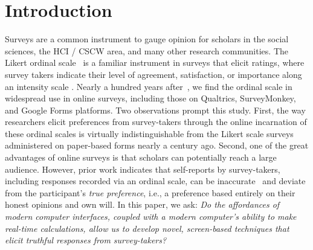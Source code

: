 \section{Introduction}

Surveys are a common instrument to gauge opinion for scholars in the social sciences, the HCI / CSCW area, and many other research communities. The Likert ordinal scale~\cite{likert1932technique} is a familiar instrument in surveys that elicit ratings, where survey takers indicate their level of agreement, satisfaction, or importance along an intensity scale \cite{moors2016two}. Nearly a hundred years after~\textcite{likert1932technique}, we find the ordinal scale in widespread use in online surveys, including those on Qualtrics, SurveyMonkey, and Google Forms platforms. Two observations prompt this study. First, the way researchers elicit preferences from survey-takers through the online incarnation of these ordinal scales is virtually indistinguishable from the Likert scale surveys administered on paper-based forms nearly a century ago.  Second, one of the great advantages of online surveys is that scholars can potentially reach a large audience. However, prior work indicates that self-reports by survey-takers, including responses recorded via an ordinal scale, can be inaccurate~\cite{araujo2017much, vavreck2007exaggerated} and deviate from the participant's \textit{true preference}, i.e., a preference based entirely on their honest opinions and own will. In this paper, we ask: \textit{Do the affordances of modern computer interfaces, coupled with a modern computer's ability to make real-time calculations, allow us to develop novel, screen-based techniques that elicit truthful responses from survey-takers?}

